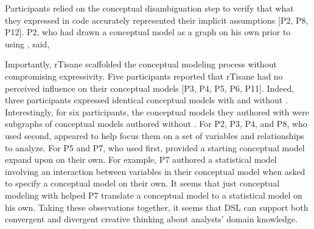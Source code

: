 Participants relied on the conceptual disambiguation step to verify that what
they expressed in code accurately represented their implicit assumptions [P2,
P8, P12]. P2, who had drawn a conceptual model as a graph on his own prior to
using \rTisane, said, 

Importantly, rTisane scaffolded the conceptual modeling process without
compromising expressivity. Five participants reported that rTisane had no
perceived influence on their conceptual models [P3, P4, P5, P6, P11]. Indeed,
three participants expressed identical conceptual models with and without
\rTisane [P9, P11, P12]. Interestingly, for six participants, the
conceptual models they authored with \rTisane were subgraphs of conceptual models
authored without \rTisane[P2, P3, P4, P5, P7, P8]. 
For P2, P3, P4, and P8, who used \rTisane second, \rTisane appeared to help
focus them on a set of variables and relationships to analyze. 
For P5 and P7,
who used \rTisane first, \rTisane provided a starting conceptual model expand
upon on their own. For example, P7 authored a statistical model involving an
interaction between variables in their \rTisane conceptual model when asked to
specify a conceptual model on their own. It seems that just conceptual modeling
with \rTisane helped P7 translate a conceptual model to a statistical model on
his own. Taking these observations together, it seems that \rTisanes DSL can
support both convergent and divergent creative thinking about analysts' domain
knowledge. 

